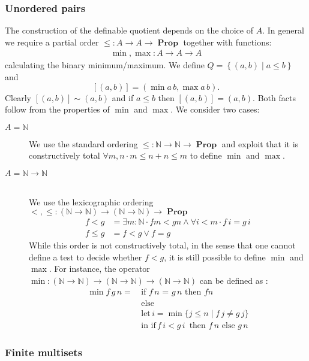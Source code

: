 \documentclass[envcountsame]{llncs}
\newcommand{\N}{\mathbb{N}}
\providecommand{\set}  [1]{\left\{#1\right\}}
\DeclareMathOperator{\Prop}{\mathbf{Prop}}
\begin{document}
\subsubsection*{Unordered pairs}

The construction of the definable quotient depends on the choice of $A$. In general we
require a partial order $\leq : A \to A \to \Prop$ together with functions:
\begin{align*}
\min, \max : A \to A \to A
\end{align*}
calculating the binary minimum/maximum. We define $Q = \set{(a , b) \mid  a \leq b}$ and 
\[ [(a,b)] = (\min a\, b, \max a \,b).\]
Clearly $[(a,b)] \sim (a,b)$ and if $a\leq b$ then $[(a,b)]=(a,b)$. Both facts follow from
 the properties of $\min$ and $\max$. We consider two cases:
\begin{description}
\item[$A = \N$] \hfill 

We use the standard ordering $\leq : \N \to \N \to \Prop$ and exploit
that it is constructively total $\forall m ,n\cdot m \leq n + n \leq m$ to define $\min$ and 
$\max$.  
\item[$A=\N\to\N$] \hfill\\
We use the lexicographic ordering ${<},{\leq}:(\N \to \N) \to (\N\to\N)\to\Prop$
\begin{align*}
f < g & = \exists m:\N \cdot f m < g n \wedge \forall i<m\cdot f\,i = g \,i\\
f \leq g &= f < g \vee f=g
\end{align*}
While this order is not constructively total, in the sense that one cannot define a test to decide whether $f<g$, it is still possible to define $\min$ and $\max$. 
For instance, the operator $\min : (\N \to \N) \to (\N\to\N) \to (\N \to \N)$ can be defined as : 
\begin{align*}
 \min f\,g\,n =\,&\text{if $f \,n$ = $g\,n$ then $f n$}\\
                 &\text{else }\\
                 &\text{let}\,i = \min \{ j \leq n \mid f\,j \not= g\,j \}\\ 
                 &\text{in }\text{if}\, f\,i< g\,i\,\text{ then } f\,n \text{ else } g\,n   
\end{align*} 
\end{description}


\subsubsection*{Finite multisets}
\end{document}
